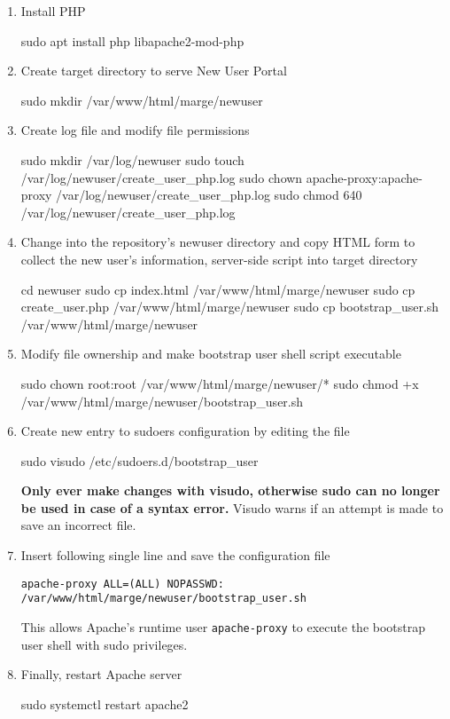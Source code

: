 \begin{enumerate}
    \item Install PHP 
    \begin{terminal}
        sudo apt install php libapache2-mod-php
    \end{terminal}
    \item Create target directory to serve New User Portal
    \begin{terminal}
        sudo mkdir /var/www/html/marge/newuser
    \end{terminal}
    \item Create log file and modify file permissions
    \begin{terminal}
        sudo mkdir /var/log/newuser
        sudo touch /var/log/newuser/create_user_php.log
        sudo chown apache-proxy:apache-proxy /var/log/newuser/create_user_php.log
        sudo chmod 640 /var/log/newuser/create_user_php.log
    \end{terminal}
    \item Change into the repository's newuser directory and copy HTML form to
    collect the new user's information, server-side script into target directory
    \begin{terminal}
        cd newuser
        sudo cp index.html /var/www/html/marge/newuser
        sudo cp create_user.php /var/www/html/marge/newuser
        sudo cp bootstrap_user.sh /var/www/html/marge/newuser
    \end{terminal}
    \item Modify file ownership and make bootstrap user shell script executable
    \begin{terminal}
        sudo chown root:root /var/www/html/marge/newuser/*
        sudo chmod +x /var/www/html/marge/newuser/bootstrap_user.sh
    \end{terminal}
    \item Create new entry to sudoers configuration by editing the file
    \begin{terminal}
        sudo visudo /etc/sudoers.d/bootstrap_user
    \end{terminal}
    \textbf{Only ever make changes with visudo, otherwise sudo can no longer be
    used in case of a syntax error.} Visudo warns if an attempt is made to save
    an incorrect file.
    \item Insert following single line and save the configuration file
    \begin{lstlisting}[frame={l}]
        apache-proxy ALL=(ALL) NOPASSWD: /var/www/html/marge/newuser/bootstrap_user.sh
    \end{lstlisting}
    This allows Apache's runtime user \texttt{apache-proxy} to execute the
    bootstrap user shell with sudo privileges.
    \item Finally, restart Apache server
    \begin{terminal}
        sudo systemctl restart apache2
    \end{terminal}
\end{enumerate}

